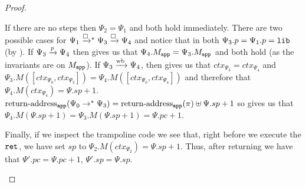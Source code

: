 \begin{proof}
\begin{itemize}
    \begin{subproof}
      If there are no steps then $\Psi_2 = \Psi_1$ and both hold immediately.
      There are two possible cases for $\Psi_1 \stepboxstar \Psi_3 \stepbox \Psi_4$ and notice that in both $\Psi_3.p = \Psi_1.p = \mathtt{lib}$ (by ).
      If $\Psi_3 \mathrel{\xrightarrow{p}} \Psi_4$ then  gives us that $\Psi_4.M_{\mathtt{app}} = \Psi_3.M_{\mathtt{app}}$ and both hold (as the invariants are on $M_{\mathtt{app}}$).
      If $\Psi_3 \mathrel{\xrightarrow{\!\text{wb}}} \Psi_4$, then  gives us that $ctx_{\Psi_3} = ctx_{\Psi_4}$ and $\Psi_3.M([ctx_{\Psi_0}, ctx_{\Psi_3}]) = \Psi_4.M([ctx_{\Psi_0}, ctx_{\Psi_4}])$ and therefore that $\Psi_4.M(ctx_{\Psi_4}) = \Psi.sp + 1$.
      $\operatorname{return-address}_{\mathtt{app}}(\Psi_0 \mathrel{\mathrel{\rightarrow}^{\ast}} \Psi_3) = \operatorname{return-address}_{\mathtt{app}}(\pi) \uplus \Psi.sp + 1$ so  gives us that $\Psi_4.M(\Psi.sp + 1) = \Psi_3.M(\Psi.sp + 1) = \Psi.pc + 1$.
    \end{subproof}

    Finally, if we inspect the trampoline code we see that, right before we execute the $\mathtt{ret}_{{}}$, we have set $sp$ to $\Psi_2.M(ctx_{\Psi_2}) = \Psi.sp + 1$.
    Thus, after returning we have that $\Psi'.pc = \Psi.pc + 1$, $\Psi'.sp = \Psi.sp$.
  \end{itemize}
\end{proof}